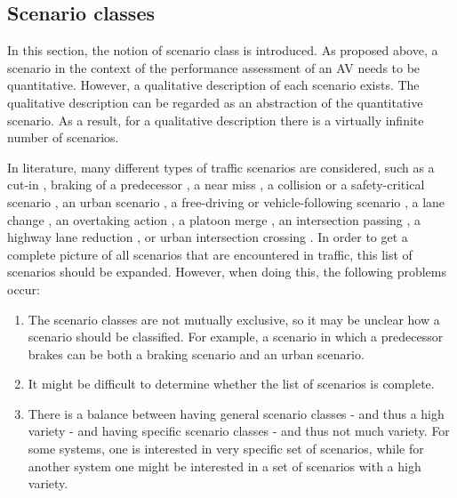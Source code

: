 \subsection{Scenario classes}
\label{sec:scenario classes}
In this section, the notion of scenario class is introduced. As proposed above, a scenario in the context of the performance assessment of an AV needs to be quantitative. However, a qualitative description of each scenario exists. The qualitative description can be regarded as an abstraction of the quantitative scenario. As a result, for a qualitative description there is a virtually infinite number of scenarios.

In literature, many different types of traffic scenarios are considered, such as a cut-in \cite{xu2002effects, gietelink2006development,roesener2017comprehensive}, braking of a predecessor \cite{xu2002effects,deGelder2017assessment,hulshof2013autonomous}, a near miss \cite{gietelink2006development}, a collision or a safety-critical scenario \cite{gietelink2006development,ebner2011identifying}, an urban scenario \cite{zofka2015datadrivetrafficscenarios}, a free-driving or vehicle-following scenario \cite{roesener2017comprehensive}, a lane change \cite{roesener2017comprehensive}, an overtaking action \cite{karaduman2013interactivebehavior}, a platoon merge \cite{englund2016grand}, an intersection passing \cite{englund2016grand}, a highway lane reduction \cite{ploeg2017GCDC}, or urban intersection crossing \cite{ploeg2017GCDC}. In order to get a complete picture of all scenarios that are encountered in traffic, this list of scenarios should be expanded. However, when doing this, the following problems occur:

\begin{enumerate}
	\item The scenario classes are not mutually exclusive, so it may be unclear how a scenario should be classified. For example, a scenario in which a predecessor brakes can be both a braking scenario and an urban scenario. \label{item:mutual exclusiveness}
	\item It might be difficult to determine whether the list of scenarios is complete.  \label{item:completeness}
	\item There is a balance between having general scenario classes - and thus a high variety - and having specific scenario classes - and thus not much variety. For some systems, one is interested in very specific set of scenarios, while for another system one might be interested in a set of scenarios with a high variety. \label{item:generality}
\end{enumerate}

